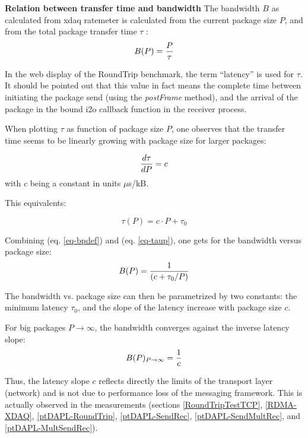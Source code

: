 {\bf Relation between transfer time and bandwidth}
The bandwidth $B$ as calculated from xdaq ratemeter is calculated from the current package size $P$, and from the total package transfer time $\tau$ :
\begin{equation}
\label{eq-bpdef}
B(P) = {\genfrac{}{}{}{}{P} {\tau}}
\end{equation}

In the web display of the RoundTrip benchmark, the term ``latency'' is 
used for $\tau$. 
It should be pointed out that this value in fact means the complete
time between initiating the package send (using the {\em postFrame} method), 
and the arrival of the package in the bound i2o callback function 
in the receiver process.

When plotting $\tau$ as function of package size $P$, one observes that
the transfer time seems to be 
linearly growing with package size for larger packages:

 \begin{equation}
\label{eq-dTaudP}
{\genfrac{}{}{}{}{d\tau} {dP}} = c
\end{equation}
with $c$ being a constant in units $\mu$s/kB. 

This equivalents: 


\begin{equation}
\label{eq-taup}
\tau(P) = c \cdot P + \tau_{0} 
\end{equation}



Combining (eq. \ref{eq-bpdef}) and (eq. \ref{eq-taup}), 
one gets for the bandwidth versus package size:
\begin{equation}
\label{eq-bp}
B(P) = {\genfrac{}{}{}{}{1}{{\left(c+{\tau_{0}/P}\right)}}}
\end{equation}


The bandwidth vs. package size can then be parametrized by two constants: the minimum latency $\tau_{0}$, and the slope of the latency increase with package 
size $c$.
 
For big packages $P \to\infty$, the bandwidth converges against the 
inverse latency slope:
\begin{equation}
\label{eq-bp-infty}
B(P)_{P \to\infty} = {\genfrac{}{}{}{}{1} {c}} 
\end{equation}

Thus, the latency slope $c$  reflects directly the limits of the transport layer (network) and is not due to performance loss of the messaging framework.
This is actually observed in the measurements 
(sections  \ref{RoundTripTestTCP}, \ref{RDMA-XDAQ}, 
\ref{ptDAPL-RoundTrip}, \ref{ptDAPL-SendRec}, \ref{ptDAPL-SendMultRec}, 
and \ref{ptDAPL-MultSendRec}).





